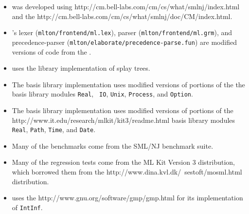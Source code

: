 \begin{itemize}

\item
{\mlton} was developed using
		  {http://cm.bell-labs.com/cm/cs/what/smlnj/index.html}
and the
		  {http://cm.bell-labs.com/cm/cs/what/smlnj/doc/CM/index.html}.

\item
{\mlton}'s lexer ({\tt mlton/frontend/ml.lex}), 
parser ({\tt mlton/frontend/ml.grm}),
and precedence-parser ({\tt mlton/elaborate/precedence-parse.fun})
are modified versions of code from the {\smlnj}.

\item
{\mlton} uses the {\smlnj} library implementation of splay trees.

\item
The {\mlton} basis library implementation uses modified versions of
portions of the the {\smlnj} basis library modules {\tt Real}, {\tt
IO}, {\tt Unix}, {\tt Process}, and {\tt Option}.

\item
The {\mlton} basis library implementation uses modified versions of
portions of the
		  {http://www.it.edu/research/mlkit/kit3/readme.html}
basis library modules {\tt Real}, {\tt Path}, {\tt Time}, and
{\tt Date}.

\item
Many of the benchmarks come from the SML/NJ benchmark suite.

\item
Many of the regression tests come from the ML Kit Version 3 distribution, which
borrowed them from the
		  {http://www.dina.kvl.dk/~sestoft/mosml.html}
distribution.

\item
{\mlton} uses the
		  {http://www.gnu.org/software/gmp/gmp.html}
for its implementation of {\tt IntInf}.

\end{itemize}

